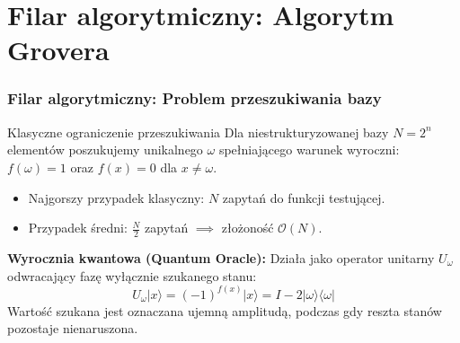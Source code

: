 \documentclass[aspectratio=169]{beamer}
\newcommand{\bra}[1]{\langle #1 \rvert}
\newcommand{\ket}[1]{\lvert #1 \rangle}
\begin{document}
\section{Filar algorytmiczny: Algorytm Grovera}
\begin{frame}
    \frametitle{Filar algorytmiczny: Problem przeszukiwania bazy}

    \begin{alertblock}{Klasyczne ograniczenie przeszukiwania}
        Dla niestrukturyzowanej bazy $N = 2^n$ elementów poszukujemy unikalnego $\omega$ spełniającego warunek wyroczni: $f(\omega) = 1$ oraz $f(x) = 0$ dla $x \neq \omega$.
        \begin{itemize}
            \item Najgorszy przypadek klasyczny: $N$ zapytań do funkcji testującej.
            \item Przypadek średni: $\frac{N}{2}$ zapytań $\implies$ złożoność $\mathcal{O}(N)$.
        \end{itemize}
    \end{alertblock}

    \vspace{0.2cm}
    \textbf{Wyrocznia kwantowa (Quantum Oracle):}
    Działa jako operator unitarny $U_\omega$ odwracający fazę wyłącznie szukanego stanu:
    \begin{equation*}
        U_\omega \ket{x} = (-1)^{f(x)} \ket{x} = I - 2\ket{\omega}\bra{\omega}
    \end{equation*}
    Wartość szukana jest oznaczana ujemną amplitudą, podczas gdy reszta stanów pozostaje nienaruszona.
\end{frame}
\end{document}
